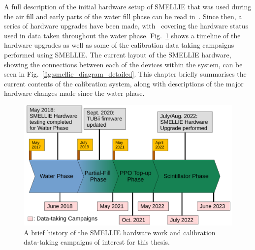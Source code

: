 A full description of the initial hardware setup of SMELLIE that was used during the air fill and early parts of the water fill phase can be read in~\cite{majumdarMeasurementOpticalScattering2015,cavalliSMELLIEHardwareManual2016}. %
Since then, a series of hardware upgrades have been made, with~\cite{turnerMeasurementScatteringCharacteristics2022,langrockMeasurementRayleighScattering2016} %
covering the hardware status used in data taken throughout the water phase.
Fig.~\ref{fig:smellie_timeline} shows a timeline of the hardware upgrades as well as some of the calibration data taking campaigns performed using SMELLIE. The current layout of the SMELLIE hardware, showing the connections between each of the devices within the system, can be seen in Fig.~\ref{fig:smellie_diagram_detailed}. This chapter briefly summarises the current contents of the calibration system, along with descriptions of the major hardware changes made since the water phase.

\begin{figure}
    \centering
    \includegraphics[width=\textwidth]{3_SMELLIEHardware/images/smellie_timeline.pdf}
    \caption[A brief history of SMELLIE hardware work and data-taking campaigns]
    {A brief history of the SMELLIE hardware work and calibration data-taking campaigns of interest for this thesis.}
    \label{fig:smellie_timeline}
\end{figure}

